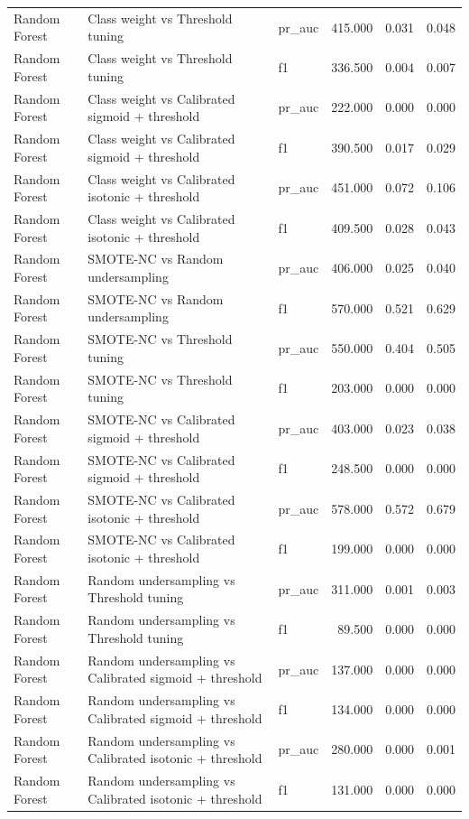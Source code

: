 \begin{tabular}{lllrrr}
Random Forest & Class weight vs Threshold tuning & pr_auc & 415.000 & 0.031 & 0.048 \\
Random Forest & Class weight vs Threshold tuning & f1 & 336.500 & 0.004 & 0.007 \\
Random Forest & Class weight vs Calibrated sigmoid + threshold & pr_auc & 222.000 & 0.000 & 0.000 \\
Random Forest & Class weight vs Calibrated sigmoid + threshold & f1 & 390.500 & 0.017 & 0.029 \\
Random Forest & Class weight vs Calibrated isotonic + threshold & pr_auc & 451.000 & 0.072 & 0.106 \\
Random Forest & Class weight vs Calibrated isotonic + threshold & f1 & 409.500 & 0.028 & 0.043 \\
Random Forest & SMOTE-NC vs Random undersampling & pr_auc & 406.000 & 0.025 & 0.040 \\
Random Forest & SMOTE-NC vs Random undersampling & f1 & 570.000 & 0.521 & 0.629 \\
Random Forest & SMOTE-NC vs Threshold tuning & pr_auc & 550.000 & 0.404 & 0.505 \\
Random Forest & SMOTE-NC vs Threshold tuning & f1 & 203.000 & 0.000 & 0.000 \\
Random Forest & SMOTE-NC vs Calibrated sigmoid + threshold & pr_auc & 403.000 & 0.023 & 0.038 \\
Random Forest & SMOTE-NC vs Calibrated sigmoid + threshold & f1 & 248.500 & 0.000 & 0.000 \\
Random Forest & SMOTE-NC vs Calibrated isotonic + threshold & pr_auc & 578.000 & 0.572 & 0.679 \\
Random Forest & SMOTE-NC vs Calibrated isotonic + threshold & f1 & 199.000 & 0.000 & 0.000 \\
Random Forest & Random undersampling vs Threshold tuning & pr_auc & 311.000 & 0.001 & 0.003 \\
Random Forest & Random undersampling vs Threshold tuning & f1 & 89.500 & 0.000 & 0.000 \\
Random Forest & Random undersampling vs Calibrated sigmoid + threshold & pr_auc & 137.000 & 0.000 & 0.000 \\
Random Forest & Random undersampling vs Calibrated sigmoid + threshold & f1 & 134.000 & 0.000 & 0.000 \\
Random Forest & Random undersampling vs Calibrated isotonic + threshold & pr_auc & 280.000 & 0.000 & 0.001 \\
Random Forest & Random undersampling vs Calibrated isotonic + threshold & f1 & 131.000 & 0.000 & 0.000 \\

\end{tabular}
